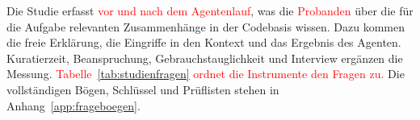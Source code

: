 

Die Studie erfasst \textcolor{red}{vor und nach dem Agentenlauf}, was die \textcolor{red}{Probanden} über die für die Aufgabe relevanten Zusammenhänge in der Codebasis wissen. Dazu kommen die freie Erklärung, die Eingriffe in den Kontext und das Ergebnis des Agenten. Kuratierzeit, Beanspruchung, Gebrauchstauglichkeit und Interview ergänzen die Messung. \textcolor{red}{Tabelle~\ref{tab:studienfragen} ordnet die Instrumente den Fragen zu.} Die vollständigen Bögen, Schlüssel und Prüflisten stehen in Anhang~\ref{app:frageboegen}.


